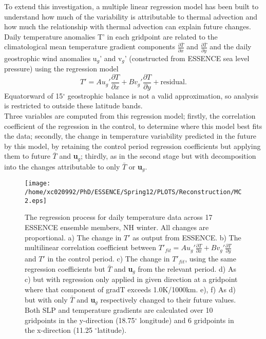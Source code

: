 \documentclass [11pt,a4paper,twosided] {report}
\begin{document}
To extend this investigation, a multiple linear regression model has been built to understand how much of the variability is attributable to thermal advection and how much the relationship with thermal advection can explain future changes. Daily temperature anomalies T' in each gridpoint are related to the climatological mean temperature gradient components $\frac{\partial \bar{T}}{\partial x}$ and $\frac{\partial \bar{T}}{\partial y}$ and the daily geostrophic wind anomalies u$_{g}$' and v$_{g}$' (constructed from ESSENCE sea level pressure) using the regression model
%
\begin{equation}
{T}'=A{u_{g}}'\frac{\partial T}{\partial x}+B{v_{g}}'\frac{\partial T}{\partial y}+\text{residual}.
\end{equation}\label{eq:reg}
Equatorward of 15$^{\circ}$ geostrophic balance is not a valid approximation, so analysis is restricted to outside these latitude bands.\\
%
Three variables are computed from this regression model; firstly, the correlation coefficient of the regression in the control, to determine where this model best fits the data; secondly, the change in temperature variability predicted in the future by this model, by retaining the control period regression coefficients but applying them to future $\bar{T}$ and {\bf u$_{g}$}; thirdly, as in the second stage but with decomposition into the changes attributable to only $\bar{T}$ or {\bf u$_{g}$}. \\
\begin{figure}[!b]
\centering
\texttt{[image: /home/xc020992/PhD/ESSENCE/Spring12/PLOTS/Reconstruction/MC2.eps]}
\caption{The regression process for daily temperature data across 17 ESSENCE ensemble members, NH winter. All changes are proportional. a) The change in $T'$ as output from ESSENCE. b) The multilinear correlation coefficient between $T'_{fit}=A{u_{g}}'\frac{\partial T}{\partial x}+B{v_{g}}'\frac{\partial T}{\partial y}$ and $T'$ in the control period. c) The change in $T'_{fit}$, using the same regression coefficients but $\bar{T}$ and {\bf u$_{g}$} from the relevant period. d) As c) but with regression only applied in given direction at a gridpoint where that component of gradT exceeds 1.0K/1000km. e), f) As d) but with only $\bar{T}$ and {\bf u$_{g}$} respectively changed to their future values. Both SLP and temperature gradients are calculated over 10 gridpoints in the y-direction (18.75$^{\circ}$ longitude) and 6 gridpoints in the x-direction (11.25 $^{\circ}$latitude). }\label{fig:SDrecon_ESS}
\end{figure}
\end{document}
